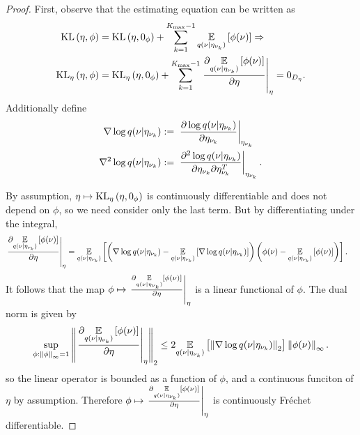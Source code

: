 \begin{thm}
\begin{proof}
First, observe that the estimating equation can be written as
%
\begin{align*}
%
\KL{\eta, \phi} ={}&
    \KL{\eta, \phiz} + \sumkm \expect{\q(\nu \vert \etanuk)}{\phi(\nu)}
    \Rightarrow \\
%
\KLgrad{\eta, \phi} ={}&
\KLgrad{\eta, \phiz} +
    \sumkm \fracat{\partial \expect{\q(\nu \vert \etanuk)}
                  {\phi(\nu)}}{\partial \eta}{\eta}
= 0_\etadim.
%
\end{align*}
%
Additionally define
%
\begin{align*}
%
\nabla \log \q(\nu \vert \etanuk) :={}&
    \fracat{\partial \log \q(\nu \vert \etanuk)}{\partial \etanuk}{\etanuk} \\
\nabla^2 \log \q(\nu \vert \etanuk) :={}&
    \fracat{\partial^2 \log \q(\nu \vert \etanuk)}
           {\partial \etanuk \partial \etanuk^T}{\etanuk}.
%
\end{align*}

By assumption, $\eta \mapsto \mathrm{KL}_{\eta}\left(\eta, 0_\phi\right)$ is continuously
differentiable and does not depend on $\phi$, so we need consider only the
last term.  But by differentiating under the integral,
%
\begin{align*}
%
\fracat{\partial \expect{\q(\nu \vert \etanuk)}
              {\phi(\nu)}}{\partial \eta}{\eta} ={}&
\expect{\q(\nu \vert \etanuk)}
       {\left(\nabla \log \q(\nu \vert \etanuk)
         - \expect{\q(\nu \vert \etanuk)}
                  {\nabla \log \q(\nu \vert \etanuk)}
       \right)
       \left( \phi(\nu) - \expect{\q(\nu \vert \etanuk)}{\phi(\nu)} \right)}.
%
\end{align*}
%
It follows that the map $\phi \mapsto \left.\frac{\partial \underset{q(\nu \vert
\eta_{\nu_{k}})}{\mathbb{E}}\left[\phi(\nu)\right]}{\partial \eta}\right\vert_{\eta}$ is a linear functional of
$\phi$.  The dual norm is given by
%
\begin{align*}
%
\sup_{\phi: \norminf{\phi} = 1}
    \norm{\fracat{\partial \expect{\q(\nu \vert
    \etanuk)} {\phi(\nu)}}{\partial \eta}{\eta}}_2 \le
    2 \expect{\q(\nu \vert \etanuk)}
             {\norm{\nabla \log \q(\nu \vert \etanuk)}_2}
              \norminf{\phi(\nu)}.
%
\end{align*}
%
so the linear operator is bounded as a function of $\phi$, and a continuous
funciton of $\eta$ by assumption.  Therefore $\phi \mapsto \left.\frac{\partial
\underset{q(\nu \vert \eta_{\nu_{k}})}{\mathbb{E}}\left[\phi(\nu)\right]}{\partial \eta}\right\vert_{\eta}$ is
continuously Fr{\'e}chet differentiable.


\end{proof}
\end{thm}
